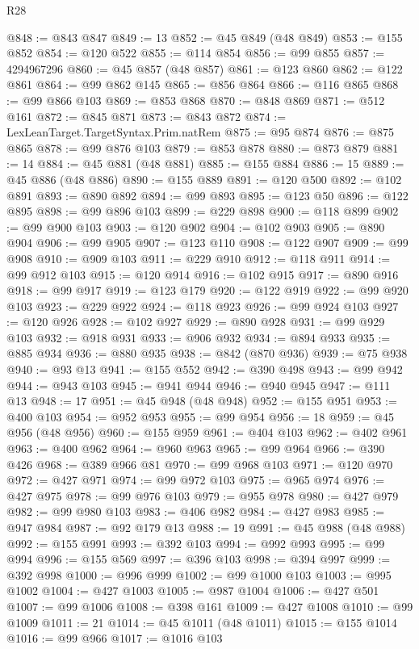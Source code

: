 \begin{lexlean}{R28}
\begin{coremodule}
@848 := @843 @847
@849 := 13
@852 := @45 @849 (@48 @849)
@853 := @155 @852
@854 := @120 @522
@855 := @114 @854
@856 := @99 @855
@857 := 4294967296
@860 := @45 @857 (@48 @857)
@861 := @123 @860
@862 := @122 @861
@864 := @99 @862 @145
@865 := @856 @864
@866 := @116 @865
@868 := @99 @866 @103
@869 := @853 @868
@870 := @848 @869
@871 := @512 @161
@872 := @845 @871
@873 := @843 @872
@874 := LexLeanTarget.TargetSyntax.Prim.natRem
@875 := @95 @874
@876 := @875 @865
@878 := @99 @876 @103
@879 := @853 @878
@880 := @873 @879
@881 := 14
@884 := @45 @881 (@48 @881)
@885 := @155 @884
@886 := 15
@889 := @45 @886 (@48 @886)
@890 := @155 @889
@891 := @120 @500
@892 := @102 @891
@893 := @890 @892
@894 := @99 @893
@895 := @123 @50
@896 := @122 @895
@898 := @99 @896 @103
@899 := @229 @898
@900 := @118 @899
@902 := @99 @900 @103
@903 := @120 @902
@904 := @102 @903
@905 := @890 @904
@906 := @99 @905
@907 := @123 @110
@908 := @122 @907
@909 := @99 @908
@910 := @909 @103
@911 := @229 @910
@912 := @118 @911
@914 := @99 @912 @103
@915 := @120 @914
@916 := @102 @915
@917 := @890 @916
@918 := @99 @917
@919 := @123 @179
@920 := @122 @919
@922 := @99 @920 @103
@923 := @229 @922
@924 := @118 @923
@926 := @99 @924 @103
@927 := @120 @926
@928 := @102 @927
@929 := @890 @928
@931 := @99 @929 @103
@932 := @918 @931
@933 := @906 @932
@934 := @894 @933
@935 := @885 @934
@936 := @880 @935
@938 := @842 (@870 @936)
@939 := @75 @938
@940 := @93 @13
@941 := @155 @552
@942 := @390 @498
@943 := @99 @942
@944 := @943 @103
@945 := @941 @944
@946 := @940 @945
@947 := @111 @13
@948 := 17
@951 := @45 @948 (@48 @948)
@952 := @155 @951
@953 := @400 @103
@954 := @952 @953
@955 := @99 @954
@956 := 18
@959 := @45 @956 (@48 @956)
@960 := @155 @959
@961 := @404 @103
@962 := @402 @961
@963 := @400 @962
@964 := @960 @963
@965 := @99 @964
@966 := @390 @426
@968 := @389 @966 @81
@970 := @99 @968 @103
@971 := @120 @970
@972 := @427 @971
@974 := @99 @972 @103
@975 := @965 @974
@976 := @427 @975
@978 := @99 @976 @103
@979 := @955 @978
@980 := @427 @979
@982 := @99 @980 @103
@983 := @406 @982
@984 := @427 @983
@985 := @947 @984
@987 := @92 @179 @13
@988 := 19
@991 := @45 @988 (@48 @988)
@992 := @155 @991
@993 := @392 @103
@994 := @992 @993
@995 := @99 @994
@996 := @155 @569
@997 := @396 @103
@998 := @394 @997
@999 := @392 @998
@1000 := @996 @999
@1002 := @99 @1000 @103
@1003 := @995 @1002
@1004 := @427 @1003
@1005 := @987 @1004
@1006 := @427 @501
@1007 := @99 @1006
@1008 := @398 @161
@1009 := @427 @1008
@1010 := @99 @1009
@1011 := 21
@1014 := @45 @1011 (@48 @1011)
@1015 := @155 @1014
@1016 := @99 @966
@1017 := @1016 @103

\end{coremodule}
\end{lexlean}
